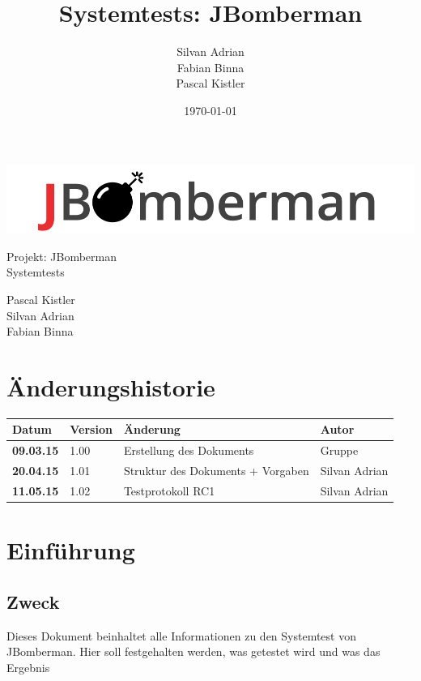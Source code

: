 \documentclass[11pt]{scrartcl}
\title{Systemtests: JBomberman}
\author{Silvan Adrian \\ Fabian Binna \\ Pascal Kistler}
\date{\today{}}
\begin{document}
\def\arraystretch{1.5}
\begin{titlepage}
\begin{center}
\vspace{10em}
\includegraphics[scale=2]{jbomberman}
\vspace{10em}
\end{center}
\begin{center}
\huge {Projekt: JBomberman} \\
\huge {Systemtests}
\end{center}
\begin{center}
\vspace{10em}
\LARGE {Pascal Kistler} \\
\LARGE {Silvan Adrian} \\
\LARGE {Fabian Binna}
\end{center}

\end{titlepage}

\newpage
\section{Änderungshistorie}
\label{sec:Änderungen}

\begin{tabularx}{\linewidth}{l l l l}
\textbf{Datum} & \textbf{Version} & \textbf{Änderung}  & \textbf{Autor} \\
\hline
\textbf{09.03.15} & 1.00 & Erstellung des Dokuments & Gruppe \\
\textbf{20.04.15} & 1.01 & Struktur des Dokuments + Vorgaben & Silvan Adrian \\
\textbf{11.05.15} & 1.02 & Testprotokoll RC1 & Silvan Adrian \\
\end{tabularx}

\newpage
\tableofcontents
\newpage
\section{Einführung}
\subsection{Zweck}
Dieses Dokument beinhaltet alle Informationen zu den Systemtest von JBomberman.
Hier soll festgehalten werden, was getestet wird und was das Ergebnis
\end{document}
